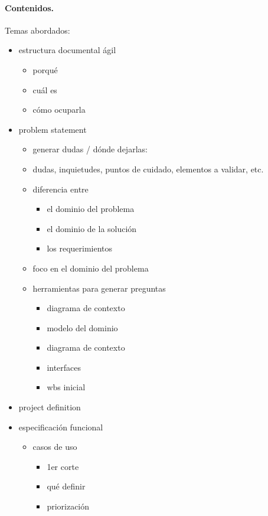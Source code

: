 \documentclass[11pt]{article}
\begin{document}
\paragraph{Contenidos.}
Temas abordados:
\begin{itemize}
\item estructura documental \'agil
      \begin{itemize}
\item     porqu\'e
\item     cu\'al es
\item     c\'omo ocuparla
      \end{itemize}
\item problem statement
      \begin{itemize}
\item     generar dudas / d\'onde dejarlas:
\item         dudas, inquietudes, puntos de cuidado, elementos a validar, etc.
\item     diferencia entre
          \begin{itemize}
\item         el dominio del problema
\item         el dominio de la soluci\'on
\item         los requerimientos
          \end{itemize}
\item     foco en el dominio del problema
\item     herramientas para generar preguntas
          \begin{itemize}
\item         diagrama de contexto
\item         modelo del dominio
\item         diagrama de contexto
\item         interfaces
\item         wbs inicial
          \end{itemize}
      \end{itemize}
\item project definition
\item especificaci\'on funcional
      \begin{itemize}
\item     casos de uso 
          \begin{itemize}
\item         1er corte
\item         qu\'e definir
\item         priorizaci\'on

\end{itemize}
\end{itemize}
\end{itemize}
\end{document}
